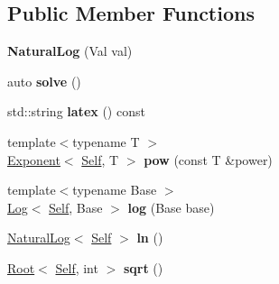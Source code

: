 \subsection*{Public Member Functions}
\begin{DoxyCompactItemize}
\item 
\hypertarget{classlatex_1_1math_1_1NaturalLog_aeeb12e56e32d76ced7fbd41e82941d0f}{{\bfseries Natural\-Log} (Val val)}\label{classlatex_1_1math_1_1NaturalLog_aeeb12e56e32d76ced7fbd41e82941d0f}

\item 
\hypertarget{classlatex_1_1math_1_1NaturalLog_ad4ffac52939e962b891122008b323abf}{auto {\bfseries solve} ()}\label{classlatex_1_1math_1_1NaturalLog_ad4ffac52939e962b891122008b323abf}

\item 
\hypertarget{classlatex_1_1math_1_1NaturalLog_af75e70ab4e10082741e89127ead0a32b}{std\-::string {\bfseries latex} () const }\label{classlatex_1_1math_1_1NaturalLog_af75e70ab4e10082741e89127ead0a32b}

\item 
\hypertarget{classlatex_1_1math_1_1NaturalLog_a94d5f44f2bb1000ae0a969cccc781bb4}{{\footnotesize template$<$typename T $>$ }\\\hyperlink{classlatex_1_1math_1_1Exponent}{Exponent}$<$ \hyperlink{classlatex_1_1math_1_1NaturalLog}{Self}, T $>$ {\bfseries pow} (const T \&power)}\label{classlatex_1_1math_1_1NaturalLog_a94d5f44f2bb1000ae0a969cccc781bb4}

\item 
\hypertarget{classlatex_1_1math_1_1NaturalLog_abea6ea1be29c3e5bbbabbcf758a79fbf}{{\footnotesize template$<$typename Base $>$ }\\\hyperlink{classlatex_1_1math_1_1Log}{Log}$<$ \hyperlink{classlatex_1_1math_1_1NaturalLog}{Self}, Base $>$ {\bfseries log} (Base base)}\label{classlatex_1_1math_1_1NaturalLog_abea6ea1be29c3e5bbbabbcf758a79fbf}

\item 
\hypertarget{classlatex_1_1math_1_1NaturalLog_ae8720764dd2a28eae1133eb7d5e584b8}{\hyperlink{classlatex_1_1math_1_1NaturalLog}{Natural\-Log}$<$ \hyperlink{classlatex_1_1math_1_1NaturalLog}{Self} $>$ {\bfseries ln} ()}\label{classlatex_1_1math_1_1NaturalLog_ae8720764dd2a28eae1133eb7d5e584b8}

\item 
\hypertarget{classlatex_1_1math_1_1NaturalLog_aa73f79ce7b2acb561a8bc190d585c7a8}{\hyperlink{classlatex_1_1math_1_1Root}{Root}$<$ \hyperlink{classlatex_1_1math_1_1NaturalLog}{Self}, int $>$ {\bfseries sqrt} ()}\label{classlatex_1_1math_1_1NaturalLog_aa73f79ce7b2acb561a8bc190d585c7a8}

\end{DoxyCompactItemize}
